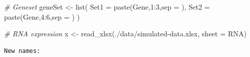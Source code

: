\documentclass[
]{book}
\newenvironment{Shaded}{\begin{snugshade}}{\end{snugshade}}
\newcommand{\AttributeTok}[1]{\textcolor[rgb]{0.77,0.63,0.00}{#1}}
\newcommand{\CommentTok}[1]{\textcolor[rgb]{0.56,0.35,0.01}{\textit{#1}}}
\newcommand{\DecValTok}[1]{\textcolor[rgb]{0.00,0.00,0.81}{#1}}
\newcommand{\FunctionTok}[1]{\textcolor[rgb]{0.00,0.00,0.00}{#1}}
\newcommand{\NormalTok}[1]{#1}
\newcommand{\OtherTok}[1]{\textcolor[rgb]{0.56,0.35,0.01}{#1}}
\newcommand{\SpecialCharTok}[1]{\textcolor[rgb]{0.00,0.00,0.00}{#1}}
\newcommand{\StringTok}[1]{\textcolor[rgb]{0.31,0.60,0.02}{#1}}
\begin{document}
\begin{Shaded}
\begin{Highlighting}[]
\CommentTok{\# Geneset}
\NormalTok{geneSet }\OtherTok{\textless{}{-}} \FunctionTok{list}\NormalTok{(}
  \AttributeTok{Set1 =} \FunctionTok{paste}\NormalTok{(}\StringTok{\textquotesingle{}Gene\textquotesingle{}}\NormalTok{,}\DecValTok{1}\SpecialCharTok{:}\DecValTok{3}\NormalTok{,}\AttributeTok{sep =} \StringTok{\textquotesingle{}\textquotesingle{}}\NormalTok{),}
  \AttributeTok{Set2 =} \FunctionTok{paste}\NormalTok{(}\StringTok{\textquotesingle{}Gene\textquotesingle{}}\NormalTok{,}\DecValTok{4}\SpecialCharTok{:}\DecValTok{6}\NormalTok{,}\AttributeTok{sep =} \StringTok{\textquotesingle{}\textquotesingle{}}\NormalTok{)}
\NormalTok{)}


\CommentTok{\# RNA expression}
\NormalTok{x }\OtherTok{\textless{}{-}} \FunctionTok{read\_xlsx}\NormalTok{(}\StringTok{\textquotesingle{}./data/simulated{-}data.xlsx\textquotesingle{}}\NormalTok{, }\AttributeTok{sheet =} \StringTok{\textquotesingle{}RNA\textquotesingle{}}\NormalTok{)}
\end{Highlighting}
\end{Shaded}

\begin{verbatim}
New names:
\end{verbatim}
\end{document}

